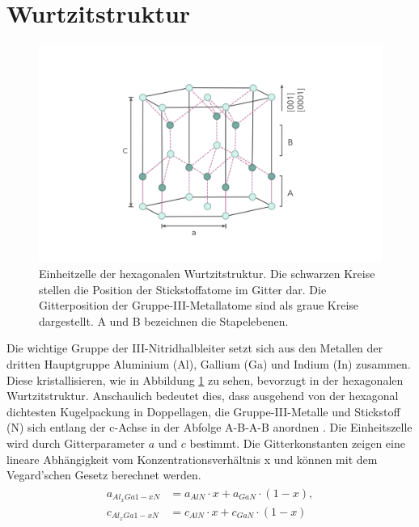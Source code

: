 \section{Wurtzitstruktur}

\begin{figure}[!htb]
    \centering
    \begin{minipage}[t]{\linewidth}
        \centering
        \includegraphics[width=0.8\linewidth]{Bilder/Wurtzite.png}
    \end{minipage}%
     \caption{Einheitzelle der hexagonalen Wurtzitstruktur. Die schwarzen Kreise stellen die Position der Stickstoffatome im Gitter dar. Die Gitterposition der Gruppe-III-Metallatome sind als graue Kreise dargestellt. A und B bezeichnen die Stapelebenen.}
        \label{fig:wurtz}
\end{figure}
\noindent
Die wichtige Gruppe der III-Nitridhalbleiter setzt sich aus den Metallen
der dritten Hauptgruppe Aluminium (Al), Gallium (Ga) und Indium (In) zusammen.
Diese kristallisieren, wie in Abbildung \ref{fig:wurtz} zu sehen, bevorzugt in der hexagonalen Wurtzitstruktur. Anschaulich bedeutet dies, dass ausgehend von der hexagonal dichtesten Kugelpackung in Doppellagen, die Gruppe-III-Metalle und Stickstoff (N) sich entlang der c-Achse in der Abfolge A-B-A-B anordnen \cite{buchc}. Die Einheitszelle wird durch Gitterparameter $a$ und $c$ bestimmt. Die Gitterkonstanten zeigen eine lineare Abhängigkeit vom Konzentrationsverhältnis x und können mit dem Vegard'schen Gesetz berechnet werden.
%
\begin{align}
\begin{split}
    a_{Al_{x}Ga{1-x}N} &= a_{AlN} \cdot x + a_{GaN} \cdot (1-x)  ,
    \\
    c_{Al_{x}Ga{1-x}N} &= c_{AlN} \cdot x + c_{GaN} \cdot (1-x) 
\end{split}
\end{align}
